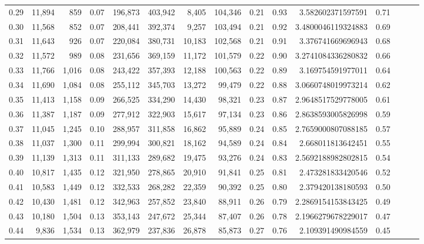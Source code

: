 \begin{tabular}{rrrrrrrrrrrrrrr}
0.29 &  11,894 &    859 &  0.07 &  196,873 &  403,942 &    8,405 &  104,346 &  0.21 &  0.93 &      3.582602371597591 &      0.71 \\
0.30 &  11,568 &    852 &  0.07 &  208,441 &  392,374 &    9,257 &  103,494 &  0.21 &  0.92 &     3.4800046119324883 &      0.69 \\
0.31 &  11,643 &    926 &  0.07 &  220,084 &  380,731 &   10,183 &  102,568 &  0.21 &  0.91 &      3.376741669696943 &      0.68 \\
0.32 &  11,572 &    989 &  0.08 &  231,656 &  369,159 &   11,172 &  101,579 &  0.22 &  0.90 &     3.2741084336280832 &      0.66 \\
0.33 &  11,766 &  1,016 &  0.08 &  243,422 &  357,393 &   12,188 &  100,563 &  0.22 &  0.89 &      3.169754591977011 &      0.64 \\
0.34 &  11,690 &  1,084 &  0.08 &  255,112 &  345,703 &   13,272 &   99,479 &  0.22 &  0.88 &     3.0660748019973214 &      0.62 \\
0.35 &  11,413 &  1,158 &  0.09 &  266,525 &  334,290 &   14,430 &   98,321 &  0.23 &  0.87 &     2.9648517529778005 &      0.61 \\
0.36 &  11,387 &  1,187 &  0.09 &  277,912 &  322,903 &   15,617 &   97,134 &  0.23 &  0.86 &     2.8638593005826998 &      0.59 \\
0.37 &  11,045 &  1,245 &  0.10 &  288,957 &  311,858 &   16,862 &   95,889 &  0.24 &  0.85 &     2.7659000807088185 &      0.57 \\
0.38 &  11,037 &  1,300 &  0.11 &  299,994 &  300,821 &   18,162 &   94,589 &  0.24 &  0.84 &      2.668011813642451 &      0.55 \\
0.39 &  11,139 &  1,313 &  0.11 &  311,133 &  289,682 &   19,475 &   93,276 &  0.24 &  0.83 &     2.5692188982802815 &      0.54 \\
0.40 &  10,817 &  1,435 &  0.12 &  321,950 &  278,865 &   20,910 &   91,841 &  0.25 &  0.81 &      2.473281833420546 &      0.52 \\
0.41 &  10,583 &  1,449 &  0.12 &  332,533 &  268,282 &   22,359 &   90,392 &  0.25 &  0.80 &      2.379420138180593 &      0.50 \\
0.42 &  10,430 &  1,481 &  0.12 &  342,963 &  257,852 &   23,840 &   88,911 &  0.26 &  0.79 &     2.2869154153843425 &      0.49 \\
0.43 &  10,180 &  1,504 &  0.13 &  353,143 &  247,672 &   25,344 &   87,407 &  0.26 &  0.78 &     2.1966279678229017 &      0.47 \\
0.44 &   9,836 &  1,534 &  0.13 &  362,979 &  237,836 &   26,878 &   85,873 &  0.27 &  0.76 &      2.109391490984559 &      0.45 \\

\end{tabular}
